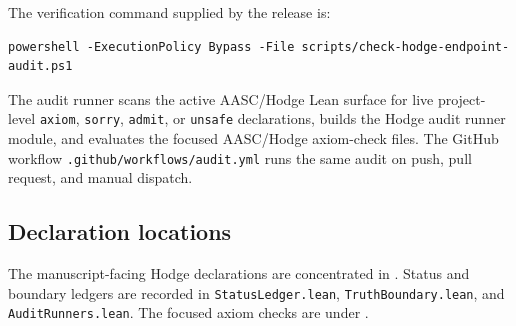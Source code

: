 \documentclass[11pt]{article}
\begin{document}
The verification command supplied by the release is:
\begin{verbatim}
powershell -ExecutionPolicy Bypass -File scripts/check-hodge-endpoint-audit.ps1
\end{verbatim}
The audit runner scans the active AASC/Hodge Lean surface for live project-level \texttt{axiom}, \texttt{sorry}, \texttt{admit}, or \texttt{unsafe} declarations, builds the Hodge audit runner module, and evaluates the focused AASC/Hodge axiom-check files. The GitHub workflow \texttt{.github/workflows/audit.yml} runs the same audit on push, pull request, and manual dispatch.

\subsection{Declaration locations}

The manuscript-facing Hodge declarations are concentrated in . Status and boundary ledgers are recorded in \texttt{StatusLedger.lean}, \texttt{TruthBoundary.lean}, and \texttt{AuditRunners.lean}. The focused axiom checks are under .
\end{document}
